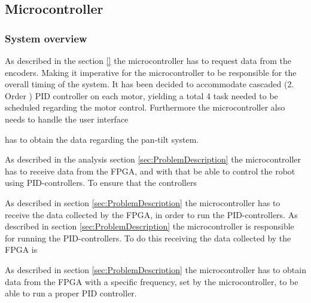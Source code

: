 \documentclass[../../main.tex]{subfiles}
\begin{document}
    



\subsection{Microcontroller} \label{subsec:SystemImplementationMicroController}

\subsubsection*{System overview}
\label{subsec:SystemImplementationOperatingSystem}

As described in the section \ref{} the microcontroller has to request data from the encoders.  Making it imperative for the microcontroller to be responsible for the overall timing of the system. It has been decided to accommodate cascaded (2. Order ) PID controller on each motor, yielding a total 4 task needed to be scheduled regarding the motor control. Furthermore the microcontroller also needs to handle the user interface 

has to obtain the data regarding the pan-tilt system. 


As described in the analysis section \ref{sec:ProblemDescription} the microcontroller has to receive data from the FPGA, and with that be able to control the robot using PID-controllers. To ensure that the controllers


As described in section \ref{sec:ProblemDescription} the microcontroller has to receive the data collected by the FPGA, in order to run the PID-controllers. 
As described in section \ref{sec:ProblemDescription} the microcontroller is responsible for running the PID-controllers. To do this receiving the data collected by the FPGA is 

As described in section \ref{sec:ProblemDescription} the microcontroller has to obtain data from the FPGA with a specific frequency, set by the microcontroller, to be able to run a proper PID controller. 
\end{document}
